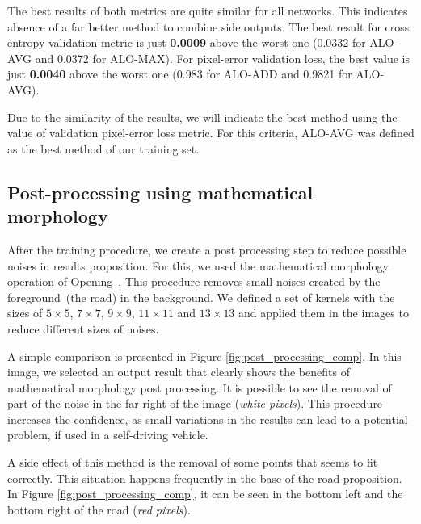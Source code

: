 The best results of both metrics are quite similar for all networks. This indicates absence of a far better method to combine side outputs. The best result for cross entropy validation metric is just \textbf{0.0009} above the worst one (0.0332 for ALO-AVG and 0.0372 for ALO-MAX). For pixel-error validation loss, the best value is just \textbf{0.0040} above the worst one (0.983 for ALO-ADD and 0.9821 for ALO-AVG).

Due to the similarity of the results, we will indicate the best method using the value of validation pixel-error loss metric. For this criteria, ALO-AVG was defined as the best method of our training set.

\subsection{Post-processing using mathematical morphology}

After the training procedure, we create a post processing step to reduce possible noises in results proposition. For this, we used the mathematical morphology operation of Opening~\cite{najman13}. This procedure removes small noises created by the foreground~(the road) in the background. We defined a set of kernels with the sizes of $5\times5$, $7\times7$, $9\times9$, $11\times11$ and $13\times13$ and applied them in the images to reduce different sizes of noises. 

A simple comparison is presented in Figure \ref{fig:post_processing_comp}. In this image, we selected an output result that clearly shows the benefits of mathematical morphology post processing. It is possible to see the removal of part of the noise in the far right of the image (\textit{white pixels}). This procedure increases the confidence, as small variations in the results can lead to a potential problem, if used in a self-driving vehicle. 

A side effect of this method is the removal of some points that seems to fit correctly. This situation happens frequently in the base of the road proposition. In Figure \ref{fig:post_processing_comp}, it can be seen in the bottom left and the bottom right of the road (\textit{red pixels}).

